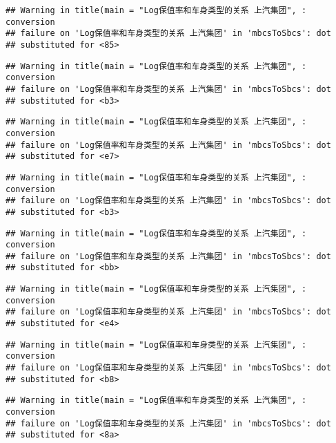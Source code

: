\documentclass[]{article}
\begin{document}
\begin{verbatim}
## Warning in title(main = "Log保值率和车身类型的关系 上汽集团", : conversion
## failure on 'Log保值率和车身类型的关系 上汽集团' in 'mbcsToSbcs': dot
## substituted for <85>
\end{verbatim}

\begin{verbatim}
## Warning in title(main = "Log保值率和车身类型的关系 上汽集团", : conversion
## failure on 'Log保值率和车身类型的关系 上汽集团' in 'mbcsToSbcs': dot
## substituted for <b3>
\end{verbatim}

\begin{verbatim}
## Warning in title(main = "Log保值率和车身类型的关系 上汽集团", : conversion
## failure on 'Log保值率和车身类型的关系 上汽集团' in 'mbcsToSbcs': dot
## substituted for <e7>
\end{verbatim}

\begin{verbatim}
## Warning in title(main = "Log保值率和车身类型的关系 上汽集团", : conversion
## failure on 'Log保值率和车身类型的关系 上汽集团' in 'mbcsToSbcs': dot
## substituted for <b3>
\end{verbatim}

\begin{verbatim}
## Warning in title(main = "Log保值率和车身类型的关系 上汽集团", : conversion
## failure on 'Log保值率和车身类型的关系 上汽集团' in 'mbcsToSbcs': dot
## substituted for <bb>
\end{verbatim}

\begin{verbatim}
## Warning in title(main = "Log保值率和车身类型的关系 上汽集团", : conversion
## failure on 'Log保值率和车身类型的关系 上汽集团' in 'mbcsToSbcs': dot
## substituted for <e4>
\end{verbatim}

\begin{verbatim}
## Warning in title(main = "Log保值率和车身类型的关系 上汽集团", : conversion
## failure on 'Log保值率和车身类型的关系 上汽集团' in 'mbcsToSbcs': dot
## substituted for <b8>
\end{verbatim}

\begin{verbatim}
## Warning in title(main = "Log保值率和车身类型的关系 上汽集团", : conversion
## failure on 'Log保值率和车身类型的关系 上汽集团' in 'mbcsToSbcs': dot
## substituted for <8a>
\end{verbatim}
\end{document}
